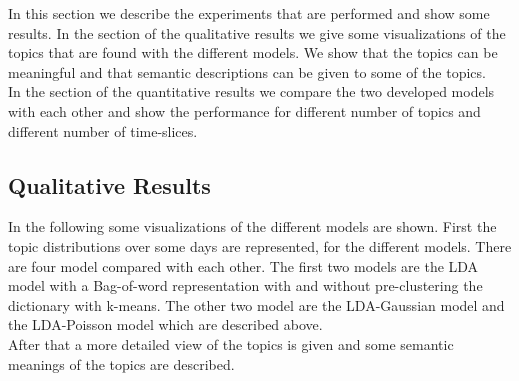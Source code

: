 In this section we describe the experiments that are performed and show some results. In the section of the qualitative results we give some visualizations of the topics that are found with the different models. We show that the topics can be meaningful and that semantic descriptions can be given to some of the topics.\\
In the section of the quantitative results we compare the two developed models with each other and show the performance for different number of topics and different number of time-slices.









\subsection{Qualitative Results}
In the following some visualizations of the different models are shown. First the topic distributions over some days are represented, for the different models. There are four model compared with each other. The first two models are the LDA model with a Bag-of-word representation with and without pre-clustering the dictionary with k-means. The other two model are the LDA-Gaussian model and the LDA-Poisson model which are described above.\\
After that a more detailed view of the topics is given and some semantic meanings of the topics are described.\\

